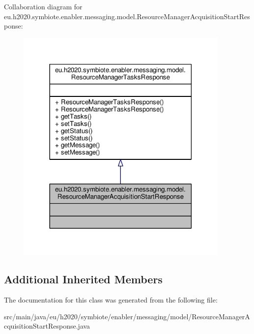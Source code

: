 Collaboration diagram for eu.\+h2020.\+symbiote.\+enabler.\+messaging.\+model.\+Resource\+Manager\+Acquisition\+Start\+Response\+:\nopagebreak
\begin{figure}[H]
\begin{center}
\leavevmode
\includegraphics[width=296pt]{classeu_1_1h2020_1_1symbiote_1_1enabler_1_1messaging_1_1model_1_1ResourceManagerAcquisitionStartResponse__coll__graph}
\end{center}
\end{figure}
\subsection*{Additional Inherited Members}


The documentation for this class was generated from the following file\+:\begin{DoxyCompactItemize}
\item 
src/main/java/eu/h2020/symbiote/enabler/messaging/model/Resource\+Manager\+Acquisition\+Start\+Response.\+java\end{DoxyCompactItemize}
